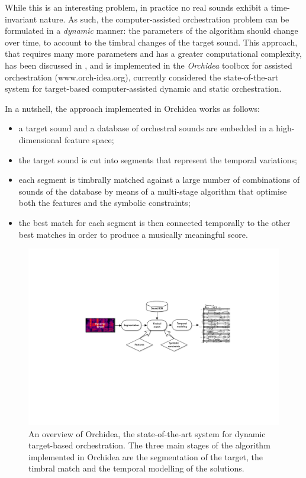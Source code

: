 \documentclass[a4paper]{book}
\begin{document}
While this is an interesting problem, in practice no real sounds exhibit a time-invariant nature. As such, the computer-assisted orchestration problem can be formulated in a \emph{dynamic} manner: the parameters of the algorithm should change over time, to account to the timbral changes of the target sound.
This approach, that requires many more parameters and has a greater computational complexity, has been discussed in \cite{Cella2018},
\cite{Cella2020b} and is implemented in the \emph{Orchidea} toolbox for assisted orchestration ({www.orch-idea.org}), currently considered the state-of-the-art system for target-based computer-assisted dynamic and static orchestration.

In a nutshell, the approach implemented in Orchidea works as follows:
\begin{itemize}
	\item a target sound and a database of orchestral sounds are embedded in a high-dimensional feature space;
	\item the target sound is cut into segments that represent the temporal variations;
	\item each segment is timbrally matched against a large number of combinations of sounds of the database
	by means of a multi-stage algorithm that optimise both the features and the symbolic constraints;
	\item the best match for each segment is then connected temporally to the other best matches in order to produce a musically meaningful score.
\end{itemize}

\begin{figure}[ht!]
\centering
\includegraphics[width=140mm]{Orchidea_overview.pdf}
\caption{An overview of Orchidea, the state-of-the-art system for dynamic target-based orchestration. The three main stages of the algorithm implemented in Orchidea are the segmentation of the target, the timbral match and the temporal modelling of the solutions.}
\label{fig:orchidea_overview}
\end{figure}
\end{document}
